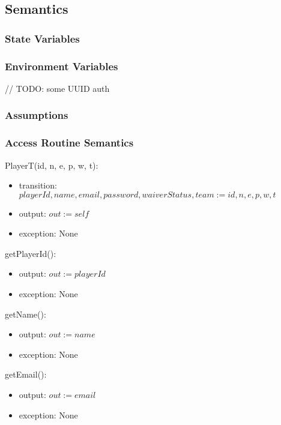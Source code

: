 \documentclass[12pt, titlepage]{article}
\begin{document}
\subsection{Semantics}

\subsubsection{State Variables}

\subsubsection{Environment Variables}

// TODO: some UUID auth

\subsubsection{Assumptions}

\subsubsection{Access Routine Semantics}

\noindent PlayerT(id, n, e, p, w, t):
\begin{itemize}
  \item transition: $playerId, name, email, password, waiverStatus, team := id, n, e, p, w, t$
  \item output: $out := self$
  \item exception: None
\end{itemize}

\noindent getPlayerId():
\begin{itemize}
  \item output: $out := playerId$
  \item exception: None
\end{itemize}

\noindent getName():
\begin{itemize}
  \item output: $out := name$
  \item exception: None
\end{itemize}

\noindent getEmail():
\begin{itemize}
  \item output: $out := email$
  \item exception: None
\end{itemize}
\end{document}
